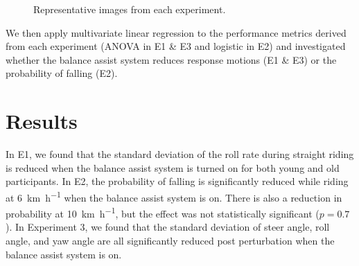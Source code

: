 \documentclass{icsc}
\def\kph{\kilo\meter\per\hour}
\begin{document}
\begin{figure}[h]
  \begin{center}
    \caption{Representative images from each experiment.}
    \label{fig:experiments}
  \end{center}
\end{figure}

We then apply multivariate linear regression to the performance metrics derived
from each experiment (ANOVA in E1 \& E3 and logistic in E2) and investigated
whether the balance assist system reduces response motions (E1 \& E3) or the
probability of falling (E2).

\section{Results}
%
In E1, we found that the standard deviation of the roll rate during straight
riding is reduced when the balance assist system is turned on for both young
and old participants. In E2, the probability of falling is significantly
reduced while riding at 6~\si{\kph} when the balance assist system is on. There
is also a reduction in probability at 10~\si{\kph}, but the effect was not
statistically significant (\(p=0.7\)). In Experiment 3, we found that the
standard deviation of steer angle, roll angle, and yaw angle are all
significantly reduced post perturbation when the balance assist system is on.
\end{document}
